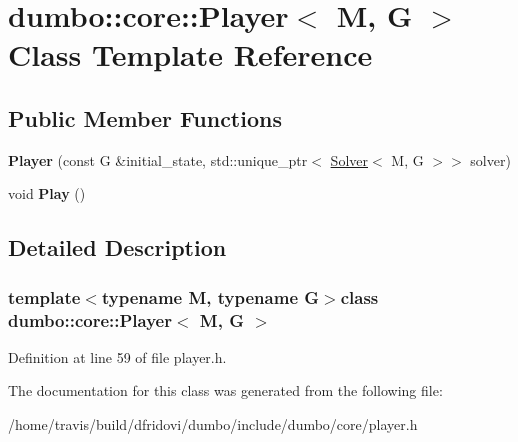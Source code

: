 \hypertarget{classdumbo_1_1core_1_1_player}{\section{dumbo\-:\-:core\-:\-:Player$<$ M, G $>$ Class Template Reference}
\label{classdumbo_1_1core_1_1_player}
}
\subsection*{Public Member Functions}
\begin{DoxyCompactItemize}
\item 
\hypertarget{classdumbo_1_1core_1_1_player_ad9550ea94ab9036808b08adb19748bf1}{{\bfseries Player} (const G \&initial\-\_\-state, std\-::unique\-\_\-ptr$<$ \hyperlink{classdumbo_1_1core_1_1_solver}{Solver}$<$ M, G $>$$>$ solver)}\label{classdumbo_1_1core_1_1_player_ad9550ea94ab9036808b08adb19748bf1}

\item 
\hypertarget{classdumbo_1_1core_1_1_player_a5c645c33681a90afbed55ee3f97b6bb4}{void {\bfseries Play} ()}\label{classdumbo_1_1core_1_1_player_a5c645c33681a90afbed55ee3f97b6bb4}

\end{DoxyCompactItemize}


\subsection{Detailed Description}
\subsubsection*{template$<$typename M, typename G$>$class dumbo\-::core\-::\-Player$<$ M, G $>$}



Definition at line 59 of file player.\-h.



The documentation for this class was generated from the following file\-:\begin{DoxyCompactItemize}
\item 
/home/travis/build/dfridovi/dumbo/include/dumbo/core/player.\-h\end{DoxyCompactItemize}
